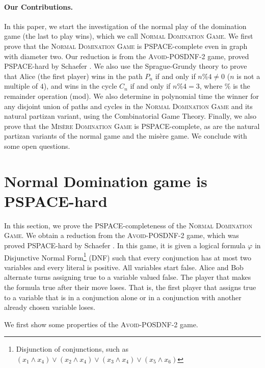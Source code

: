 \documentclass[12pt]{article}
\begin{document}
\paragraph{Our Contributions.}
In this paper, we start the investigation of the normal play of the domination game (the last to play wins), which we call \textsc{Normal Domination Game}.
We first prove that the \textsc{Normal Domination Game} is PSPACE-complete even in graph with diameter two. Our reduction is from the \textsc{Avoid-POSDNF-2} game, proved PSPACE-hard by Schaefer \cite{schaefer-1978}.
We also use the Sprague-Grundy theory to prove that Alice (the first player) wins in the path $P_n$ if and only if $n\%4\ne 0$ ($n$ is not a multiple of $4$), and wins in the cycle $C_n$ if and only if $n\%4=3$, where $\%$ is the remainder operation (mod).
We also determine in polynomial time the winner for any disjoint union of paths and cycles in the \textsc{Normal Domination Game} and its natural partizan variant, using the Combinatorial Game Theory.
Finally, we also prove that the \textsc{Misère Domination Game} is PSPACE-complete, as are the natural partizan variants of the normal game and the misère game.
We conclude with some open questions.



\section{Normal Domination game is PSPACE-hard}\label{sec:pspace}

In this section, we prove the PSPACE-completeness of the \textsc{Normal Domination Game}.
We obtain a reduction from the \textsc{Avoid-POSDNF-2} game, which was proved PSPACE-hard by Schaefer \cite{schaefer-1978}.
In this game, it is given a logical formula $\varphi$ in Disjunctive Normal Form\footnote{Disjunction of conjunctions, such as $(x_1\land x_4)\lor(x_2\land x_4)\lor(x_3\land x_4)\lor(x_5\land x_6)$} (DNF) such that every conjunction has at most two variables and every literal is positive. All variables start false. Alice and Bob alternate turns assigning true to a variable valued false. The player that makes the formula true after their move loses. That is, the first player that assigns true to a variable that is in a conjunction alone or in a conjunction with another already chosen variable loses.

We first show some properties of the \textsc{Avoid-POSDNF-2} game.
\end{document}
